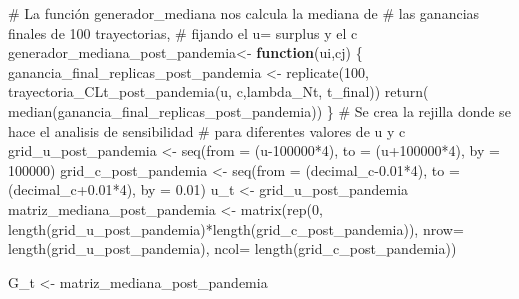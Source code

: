 \documentclass[
  us-letterpaper,
]{scrreprt}
\newenvironment{Shaded}{\begin{snugshade}}{\end{snugshade}}
\newcommand{\AttributeTok}[1]{\textcolor[rgb]{0.40,0.45,0.13}{#1}}
\newcommand{\CommentTok}[1]{\textcolor[rgb]{0.37,0.37,0.37}{#1}}
\newcommand{\ControlFlowTok}[1]{\textcolor[rgb]{0.00,0.23,0.31}{\textbf{#1}}}
\newcommand{\DecValTok}[1]{\textcolor[rgb]{0.68,0.00,0.00}{#1}}
\newcommand{\FloatTok}[1]{\textcolor[rgb]{0.68,0.00,0.00}{#1}}
\newcommand{\FunctionTok}[1]{\textcolor[rgb]{0.28,0.35,0.67}{#1}}
\newcommand{\NormalTok}[1]{\textcolor[rgb]{0.00,0.23,0.31}{#1}}
\newcommand{\OtherTok}[1]{\textcolor[rgb]{0.00,0.23,0.31}{#1}}
\newcommand{\SpecialCharTok}[1]{\textcolor[rgb]{0.37,0.37,0.37}{#1}}
\theoremstyle{plain}
\theoremstyle{plain}
\theoremstyle{definition}
\theoremstyle{remark}
\begin{document}
\begin{Shaded}
\begin{Highlighting}[]
\CommentTok{\# La función generador\_mediana nos calcula la mediana de }
\CommentTok{\# las ganancias finales de 100 trayectorias, }
\CommentTok{\# fijando el u= surplus y el c}
\NormalTok{generador\_mediana\_post\_pandemia}\OtherTok{\textless{}{-}} \ControlFlowTok{function}\NormalTok{(ui,cj)}
\NormalTok{  \{}
\NormalTok{  ganancia\_final\_replicas\_post\_pandemia }\OtherTok{\textless{}{-}} \FunctionTok{replicate}\NormalTok{(}\DecValTok{100}\NormalTok{,}
           \FunctionTok{trayectoria\_CLt\_post\_pandemia}\NormalTok{(u, c,lambda\_Nt, t\_final))}
    \FunctionTok{return}\NormalTok{( }\FunctionTok{median}\NormalTok{(ganancia\_final\_replicas\_post\_pandemia))}
\NormalTok{  \}}
\CommentTok{\# Se crea la rejilla donde se hace el analisis de sensibilidad}
\CommentTok{\# para diferentes valores de u y c}
\NormalTok{grid\_u\_post\_pandemia }\OtherTok{\textless{}{-}} \FunctionTok{seq}\NormalTok{(}\AttributeTok{from =}\NormalTok{ (u}\DecValTok{{-}100000}\SpecialCharTok{*}\DecValTok{4}\NormalTok{), }
                            \AttributeTok{to =}\NormalTok{ (u}\SpecialCharTok{+}\DecValTok{100000}\SpecialCharTok{*}\DecValTok{4}\NormalTok{), }
                            \AttributeTok{by =} \DecValTok{100000}\NormalTok{)}
\NormalTok{grid\_c\_post\_pandemia }\OtherTok{\textless{}{-}} \FunctionTok{seq}\NormalTok{(}\AttributeTok{from =}\NormalTok{ (decimal\_c}\FloatTok{{-}0.01}\SpecialCharTok{*}\DecValTok{4}\NormalTok{), }
                            \AttributeTok{to =}\NormalTok{ (decimal\_c}\FloatTok{+0.01}\SpecialCharTok{*}\DecValTok{4}\NormalTok{), }
                            \AttributeTok{by =} \FloatTok{0.01}\NormalTok{)}
\NormalTok{u\_t }\OtherTok{\textless{}{-}}\NormalTok{ grid\_u\_post\_pandemia}
\NormalTok{matriz\_mediana\_post\_pandemia }\OtherTok{\textless{}{-}} \FunctionTok{matrix}\NormalTok{(}\FunctionTok{rep}\NormalTok{(}\DecValTok{0}\NormalTok{, }
      \FunctionTok{length}\NormalTok{(grid\_u\_post\_pandemia)}\SpecialCharTok{*}\FunctionTok{length}\NormalTok{(grid\_c\_post\_pandemia)),}
      \AttributeTok{nrow=} \FunctionTok{length}\NormalTok{(grid\_u\_post\_pandemia), }
      \AttributeTok{ncol=} \FunctionTok{length}\NormalTok{(grid\_c\_post\_pandemia))}

\NormalTok{G\_t }\OtherTok{\textless{}{-}}\NormalTok{ matriz\_mediana\_post\_pandemia}


\end{Highlighting}
\end{Shaded}
\end{document}
